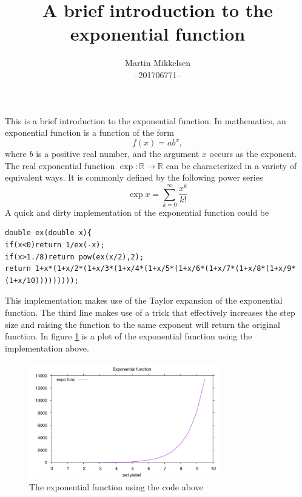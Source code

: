 \documentclass[a4paper,oneside]{memoir}
\newcommand{\R}{\mathbb{R}}
\begin{document}
	\author{Martin Mikkelsen  \\
		--201706771-- \\ }
	\title{A brief introduction to the exponential function}
	\maketitle



	\thispagestyle{firststyle}

This is a brief introduction to the exponential function. In mathematics, an exponential function is a function of the form
\begin{equation} \label{def}
  f(x)=ab^x,
\end{equation}
where $b$ is a positive real number, and the argument $x$  occurs as the exponent. The real exponential function $\exp:\R \rightarrow \R$ can be characterized in a variety of equivalent ways. It is commonly defined by the following power series
\begin{equation}
  \exp{x} = \sum_{k=0}^{\infty} \frac{x^k}{k!}
\end{equation}
A quick and dirty implementation of the exponential function could be
\begin{lstlisting}
double ex(double x){
if(x<0)return 1/ex(-x);
if(x>1./8)return pow(ex(x/2),2);
return 1+x*(1+x/2*(1+x/3*(1+x/4*(1+x/5*(1+x/6*(1+x/7*(1+x/8*(1+x/9*(1+x/10)))))))));
\end{lstlisting}
This implementation makes use of the Taylor expansion of the exponential function. The third line makes use of a trick that effectively increases the step size and raising the function to the same exponent will return the original function.
In figure \ref{Expo} is a plot of the exponential function using the implementation above.
\begin{figure}[H]
  \centering
  \includegraphics[width=0.75\textwidth]{expo}
  \caption{The exponential function using the code above}
  \label{Expo}
\end{figure}
\end{document}
